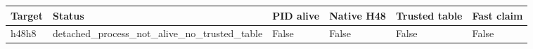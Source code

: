 {\small
\begin{tabular}{llllll}
\hline
Target & Status & PID alive & Native H48 & Trusted table & Fast claim \\
\hline
h48h8 & detached\_process\_not\_alive\_no\_trusted\_table & False & False & False & False \\
\hline
\end{tabular}
}
